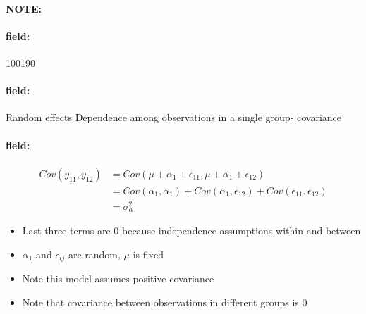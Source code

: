 \documentclass[12pt]{article}
\newenvironment{note}{\paragraph{NOTE:}}{}
\newenvironment{field}{\paragraph{field:}}{}
\begin{document}
\begin{note}
    \begin{field}
        \tiny 100190
    \end{field}
    \begin{field}
        Random effects Dependence among observations in a single group- covariance
    \end{field}
    \begin{field}
        \begin{align*}
          Cov(y_{11},y_{12}) &= Cov(\mu + \alpha_1 + \epsilon_{11}, \mu + \alpha_1 + \epsilon_{12})\\
          &= Cov(\alpha_1,\alpha_1) + Cov(\alpha_1,\epsilon_{12}) + Cov(\epsilon_{11},\epsilon_{12})\\
          &= \sigma_\alpha^2
        \end{align*}
        \begin{itemize}
          \item Last three terms are 0 because independence assumptions within and between
          \item $\alpha_1$ and $\epsilon_{ij}$ are random, $\mu$ is fixed
          \item Note this model assumes positive covariance
          \item Note that covariance between observations in different groups is 0
        \end{itemize}
    \end{field}
\end{note}
\end{document}
